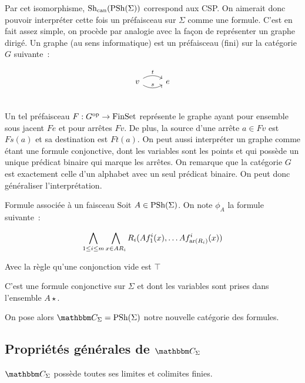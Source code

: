 \begin{pv}
\end{pv}

Par cet isomorphisme, $\text{Sh}_\text{can}(\text{PSh}(\Sigma))$ correspond aux CSP. On aimerait donc pouvoir
interpréter cette fois un préfaisceau sur $\Sigma$ comme une formule. C'est en fait assez
simple, on procède par analogie avec la façon de représenter un graphe dirigé. Un graphe
(au sens informatique) est un préfaisceau (fini) sur la catégorie $G$ suivante~:

\[\begin{tikzcd}
    v \arrow[r, bend right, "s"] \arrow[r, bend left, "t"] & e \\
\end{tikzcd}\]

Un tel préfaisceau $F : G^{\text{op}}\rightarrow\text{FinSet}$ représente le graphe ayant pour
ensemble sous jacent $Fe$ et pour arrêtes $Fv$. De plus, la source d'une arrête $a\in Fv$
est $Fs(a)$ et sa destination est $Ft(a)$. On peut aussi interpréter un graphe comme
étant une formule conjonctive, dont les variables sont les points et qui possède un
unique prédicat binaire qui marque les arrêtes. On remarque que la catégorie $G$ est
exactement celle d'un alphabet avec un seul prédicat binaire. On peut donc généraliser
l'interprétation.

\begin{defi}{Formule associée à un faisceau}
    Soit $A\in\text{PSh}(\Sigma)$. On note $\phi_A$ la formule suivante~:
    
    \[\bigwedge_{1\leq i\leq m} \bigwedge_{x\in AR_i}
            R_i(Af_1^i(x), \dots Af_{\text{ar}(R_i)}^i(x)) \]

    Avec la règle qu'une conjonction vide est $\top$

    C'est une formule conjonctive sur $\Sigma$ et dont les variables sont prises dans
    l'ensemble $A\star$.
\end{defi}

On pose alors $\C_\Sigma = \psh(\Sigma)$ notre nouvelle catégorie des formules.

\subsection{Propriétés générales de $\C_\Sigma$}

\begin{lem}
    $\C_\Sigma$ possède toutes ses limites et colimites finies.
\end{lem}

